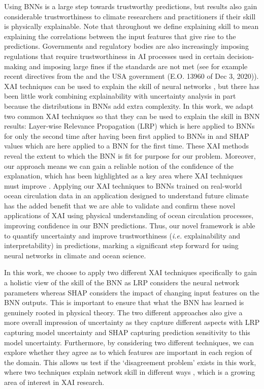 \documentclass[a4paper]{article}
\begin{document}
Using BNNs is a large step towards trustworthy predictions, but results also gain considerable trustworthiness to climate researchers and practitioners if their skill is physically explainable. Note that throughout we define explaining skill to mean explaining the correlations between the input features that give rise to the predictions. Governments and regulatory bodies are also increasingly imposing regulations that require trustworthiness in AI processes used in certain decision-making \citep[see][]{cath2018artificial} and imposing large fines if the standards are not met (see for example recent directives from the \cite{EU_law} and the USA government (E.O. 13960 of Dec 3, 2020)). XAI techniques can be used to explain the skill of neural networks \citep{samek2019explainable,samek2021explaining,arrieta2020explainable}, but there has been little work combining explainability with uncertainty analysis in part because the distributions in BNNs add extra complexity. In this work, we adapt two common XAI techniques so that they can be used to explain the skill in BNN results: Layer-wise Relevance Propagation (LRP) \citep{binder2016layer} which is here applied to BNNs for only the second time after having been first applied to BNNs in \cite{Bykov2020} and SHAP values \citep{lundberg2017unified} which are here applied to a BNN for the first time. These XAI methods reveal the extent to which the BNN is fit for purpose for our problem. Moreover, our approach means we can gain a reliable notion of the confidence of the explanation, which has been highlighted as a key area where XAI techniques must improve \citep{lakkaraju2022rethinking}. Applying our XAI techniques to BNNs trained on real-world ocean circulation data in an application designed to understand future climate has the added benefit that we are able to validate and confirm these novel applications of XAI using physical understanding of ocean circulation processes, improving confidence in our BNN predictions. Thus, our novel framework is able to quantify uncertainty and improve trustworthiness (\textit{i.e.} explainability and interpretability) in predictions, marking a significant step forward for using neural networks in climate and ocean science.

In this work, we choose to apply two different XAI techniques specifically to gain a holistic view of the skill of the BNN as LRP considers the neural network parameters whereas SHAP considers the impact of changing input features on the BNN outputs. This is important to ensure that what the BNN has learned is genuinely rooted in physical theory. The two different approaches also give a more overall impression of uncertainty as they capture different aspects with LRP capturing model uncertainty and SHAP capturing prediction sensitivity to this model uncertainty. Furthermore, by considering two different techniques, we can explore whether they agree as to which features are important in each region of the domain. This allows us test if the `disagreement problem' exists in this work, where two techniques explain network skill in different ways \citep{krishna2022disagreement}, which is a growing area of interest in XAI research. 
\end{document}
